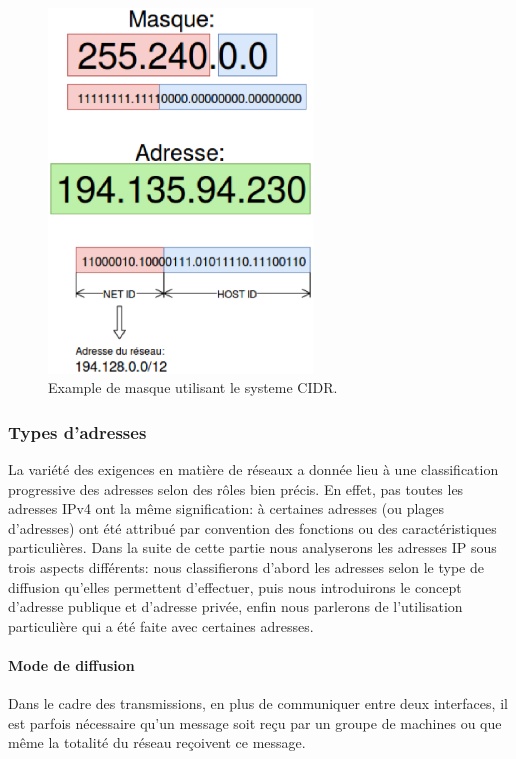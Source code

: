 \begin{figure}[h]
\centering
\includegraphics[width=7cm]{./pics/maskipv4cidr.eps}
\caption{Example de masque utilisant le systeme CIDR.}
\label{fig:exmask}
\end{figure}


\subsubsection{Types d'adresses}
La variété des exigences en matière de réseaux a donnée lieu à une
classification progressive des adresses selon des rôles bien précis. En effet,
pas toutes les adresses IPv4 ont la même signification: à certaines adresses
(ou plages d'adresses) ont été attribué par convention des fonctions ou des
caractéristiques particulières.  Dans la suite de cette partie nous analyserons les
adresses IP sous trois aspects différents: nous classifierons d'abord les adresses selon
le type de diffusion qu'elles permettent d'effectuer, puis nous introduirons le
concept d'adresse publique et d'adresse privée, enfin nous parlerons de l'utilisation
particulière qui a été faite avec certaines adresses.



\paragraph{Mode de diffusion}
Dans le cadre des transmissions, en plus de communiquer entre deux interfaces, il est 
parfois nécessaire qu'un message soit reçu par un groupe de machines ou que 
même la totalité du réseau reçoivent ce message.


